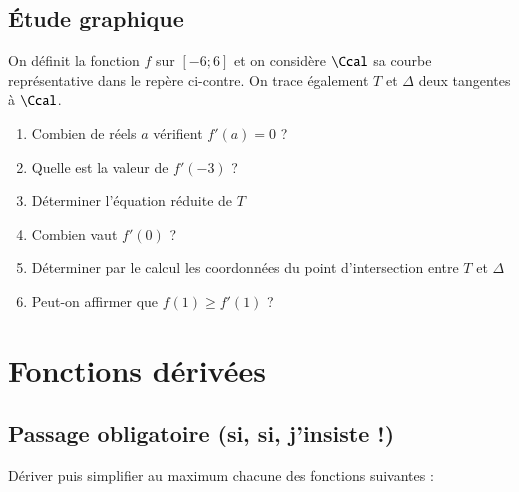 \documentclass[oneside,12pt]{article}          %
\begin{document}
\subsection{Étude graphique}
\begin{minipage}{0.5\linewidth}
On définit la fonction $f$ sur $[-6;6]$ et on considère $\Ccal$ sa courbe représentative dans le repère ci-contre. On trace également $T$ et $\Delta$ deux tangentes à $\Ccal$.
\begin{enumerate}
	\item Combien de réels $a$ vérifient $f'(a)=0$ ?
	\item Quelle est la valeur de $f'(-3)$ ?
	\item Déterminer l'équation réduite de $T$
	\item Combien vaut $f'(0)$ ?
	\item Déterminer par le calcul les coordonnées du point d'intersection entre $T$ et $\Delta$
	\item Peut-on affirmer que $f(1)\geq f'(1)$ ?
\end{enumerate}
\end{minipage}\hfill
\begin{minipage}{0.5\linewidth}
\end{minipage}



\section{Fonctions dérivées}

\subsection{Passage obligatoire (si, si, j'insiste !)}
Dériver puis simplifier au maximum chacune des fonctions suivantes :
\end{document}
